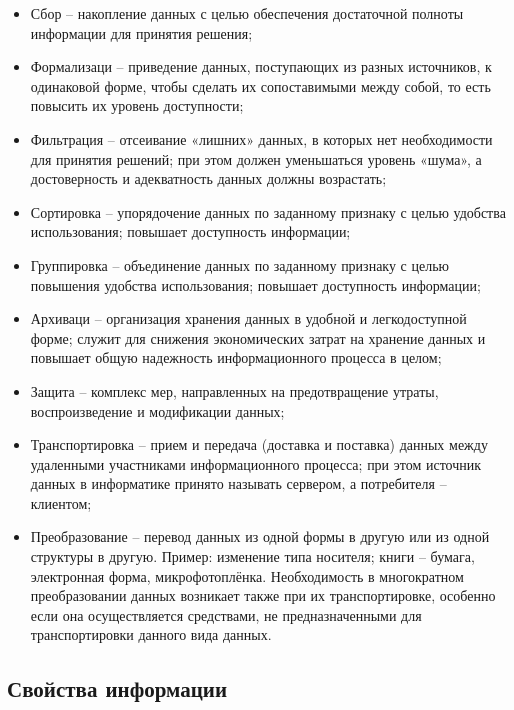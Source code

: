 \documentclass[a4paper]{article}
\begin{document}
\begin{itemize}
\item Сбор – накопление данных с целью обеспечения достаточной полноты информации для принятия решения;

\item Формализаци – приведение данных, поступающих из разных источников, к одинаковой форме, чтобы сделать их сопоставимыми между собой, то есть повысить их уровень доступности;

\item Фильтрация – отсеивание «лишних» данных, в которых нет необходимости для принятия решений; при этом должен уменьшаться уровень «шума», а достоверность и адекватность данных должны возрастать;

\item Сортировка – упорядочение данных по заданному признаку с целью удобства использования; повышает доступность информации;

\item Группировка – объединение данных по заданному признаку с целью повышения удобства использования; повышает доступность информации;

\item Архиваци – организация хранения данных в удобной и легкодоступной форме; служит для снижения экономических затрат на хранение данных и повышает общую надежность информационного процесса в целом;

\item Защита – комплекс мер, направленных на предотвращение утраты, воспроизведение и модификации данных;

\item Транспортировка – прием и передача (доставка и поставка) данных между удаленными участниками информационного процесса; при этом источник данных в информатике принято называть сервером, а потребителя – клиентом;

\item Преобразование – перевод данных из одной формы в другую или из одной структуры в другую. Пример: изменение типа носителя; книги – бумага, электронная форма, микрофотоплёнка. Необходимость в многократном преобразовании данных возникает также при их транспортировке, особенно если она осуществляется средствами, не предназначенными для транспортировки данного вида данных.

\end{itemize}

\subsection{Свойства информации}
\end{document}
